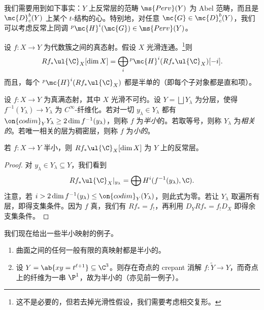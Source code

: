 我们需要用到如下事实：\(Y\) 上反常层的范畴 \(\ms{Perv}(Y)\) 为 Abel 范畴，而且是 \(\mc{D}_c^b(Y)\) 上某个 \(t\)-结构的心。特别地，对任意 \(\mc{G} \in \mc{D}_c^b (Y)\)，我们可以考虑反常上同调 \(^p\mc{H}^i(\mc{G}) \in \ms{Perv}(Y)\)。

\begin{thm}
    设 \(f \colon X \to Y\) 为代数簇之间的真态射。假设 \(X\) 光滑连通。\footnote{这不是必要的，但若去掉光滑性假设，我们需要考虑相交复形。}则
    \[ R f_* \ul{\C}_X [\dim X] = \bigoplus_{i} {^p\mc{H}^i}(R f_* \ul{\C}_X)[-i]. \]
    而且，每个 \(^p\mc{H}^i (R f_* \ul{\C}_X)\) 都是半单的（即每个子对象都是直和项）。
\end{thm}

\begin{defn}
    设 \(f \colon X \to Y\) 为真满态射，其中 \(X\) 光滑不可约。设 \(Y = \bigsqcup Y_{\lambda}\) 为分层，使得 \(f^{-1}(Y_{\lambda}) \to Y_{\lambda}\) 为 \(C^{\infty}\)-纤维化。若对一切 \(y_{\lambda} \in Y_{\lambda}\) 都有 \(\on{codim}_Y Y_{\lambda} \geq 2 \dim f^{-1} (y_{\lambda})\)，则称 \(f\) 为\textit{半小}的。若取等号，则称 \(Y_{\lambda}\) 为\textit{相关的}。若唯一相关的层为稠密层，则称 \(f\) 为\textit{小的}。
\end{defn}

\begin{thm}
    若 \(f \colon X \to Y\) 半小，则 \(R f_* \ul{\C}_X [\dim X]\) 为 \(Y\) 上的反常层。
\end{thm}

\begin{proof}
    对 \(y_{\lambda} \in Y_{\lambda} \subseteq Y\)，我们看到
    \[ R f_* \ul{\C}_X |_{y_{\lambda}} = \bigoplus H^i (f^{-1}(y_{\lambda}), \C). \]
    注意，若 \(i > 2 \dim f^{-1}(y_{\lambda}) \leq \on{codim}_Y (Y_{\lambda})\)，则此式为零。若让 \(Y_{\lambda}\) 取遍所有层，即得支集条件。因为 \(f\) 真，我们有 \(R f_* = f_!\)，再利用 \(D_Y R f_* = f_! D_X\) 即得余支集条件。
\end{proof}

\begin{exms}
    我们现在给出一些半小映射的例子。
    \begin{enumerate}
        \item 曲面之间的任何一般有限的真映射都是半小的。
        \item 设 \(Y = \ab\{xy = t^{\ell+1}\} \subseteq \C^3\)。则存在奇点的 crepant 消解 \(f \colon \tilde{Y} \to Y\)，而奇点上的纤维为一串 \(\P^1\)，故为半小的（亦见前一例子）。
    \end{enumerate}
\end{exms}

